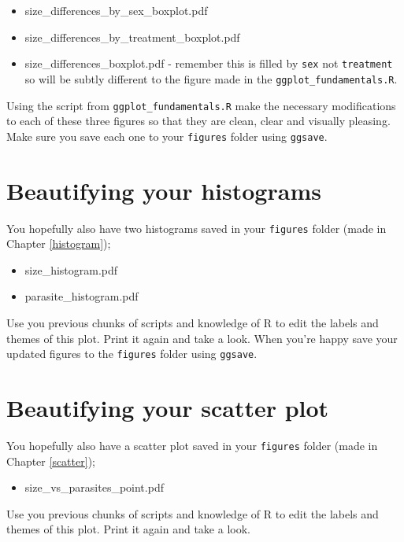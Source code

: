 \documentclass[
]{book}
\providecommand{\tightlist}{%
  \setlength{\itemsep}{0pt}\setlength{\parskip}{0pt}}
\begin{document}
\begin{itemize}
\tightlist
\item
  size\_differences\_by\_sex\_boxplot.pdf
\item
  size\_differences\_by\_treatment\_boxplot.pdf
\item
  size\_differences\_boxplot.pdf - remember this is filled by \texttt{sex} not \texttt{treatment} so will be subtly different to the figure made in the \texttt{ggplot\_fundamentals.R}.
\end{itemize}

Using the script from \texttt{ggplot\_fundamentals.R} make the necessary modifications to each of these three figures so that they are clean, clear and visually pleasing. Make sure you save each one to your \texttt{figures} folder using \texttt{ggsave}.

\section{Beautifying your histograms}\label{beautifying-your-histograms}

You hopefully also have two histograms saved in your \texttt{figures} folder (made in Chapter \ref{histogram});

\begin{itemize}
\tightlist
\item
  size\_histogram.pdf
\item
  parasite\_histogram.pdf
\end{itemize}

Use you previous chunks of scripts and knowledge of R to edit the labels and themes of this plot. Print it again and take a look. When you're happy save your updated figures to the \texttt{figures} folder using \texttt{ggsave}.

\section{Beautifying your scatter plot}\label{beautifying-your-scatter-plot}

You hopefully also have a scatter plot saved in your \texttt{figures} folder (made in Chapter \ref{scatter});

\begin{itemize}
\tightlist
\item
  size\_vs\_parasites\_point.pdf
\end{itemize}

Use you previous chunks of scripts and knowledge of R to edit the labels and themes of this plot. Print it again and take a look.
\end{document}
